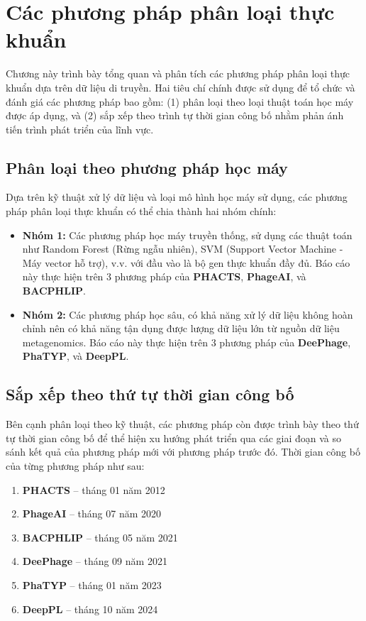 \chapter{Các phương pháp phân loại thực khuẩn}

Chương này trình bày tổng quan và phân tích các phương pháp phân loại thực khuẩn dựa trên dữ liệu di truyền. Hai tiêu chí chính được sử dụng để tổ chức và đánh giá các phương pháp bao gồm: (1) phân loại theo loại thuật toán học máy được áp dụng, và (2) sắp xếp theo trình tự thời gian công bố nhằm phản ánh tiến trình phát triển của lĩnh vực.

\section{Phân loại theo phương pháp học máy}

Dựa trên kỹ thuật xử lý dữ liệu và loại mô hình học máy sử dụng, các phương pháp phân loại thực khuẩn có thể chia thành hai nhóm chính:

\begin{itemize}
    \item \textbf{Nhóm 1:} Các phương pháp học máy truyền thống, sử dụng các thuật toán như Random Forest (Rừng ngẫu nhiên), SVM (Support Vector Machine - Máy vector hỗ trợ), v.v. với đầu vào là bộ gen thực khuẩn đầy đủ. Báo cáo này thực hiện trên 3 phương pháp của \textbf{PHACTS}, \textbf{PhageAI}, và \textbf{BACPHLIP}.
    
    \item \textbf{Nhóm 2:} Các phương pháp học sâu, có khả năng xử lý dữ liệu không hoàn chỉnh nên có khả năng tận dụng được lượng dữ liệu lớn từ nguồn dữ liệu metagenomics. Báo cáo này thực hiện trên 3 phương pháp của \textbf{DeePhage}, \textbf{PhaTYP}, và \textbf{DeepPL}.
\end{itemize}

\section{Sắp xếp theo thứ tự thời gian công bố}

Bên cạnh phân loại theo kỹ thuật, các phương pháp còn được trình bày theo thứ tự thời gian công bố để thể hiện xu hướng phát triển qua các giai đoạn và so sánh kết quả của phương pháp mới với phương pháp trước đó. Thời gian công bố của từng phương pháp như sau:

\begin{enumerate}
    \item \textbf{PHACTS} – tháng 01 năm 2012
    \item \textbf{PhageAI} – tháng 07 năm 2020
    \item \textbf{BACPHLIP} – tháng 05 năm 2021
    \item \textbf{DeePhage} – tháng 09 năm 2021
    \item \textbf{PhaTYP} – tháng 01 năm 2023
    \item \textbf{DeepPL} – tháng 10 năm 2024
\end{enumerate}

